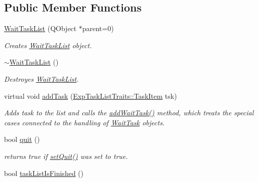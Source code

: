 \subsection*{Public Member Functions}
\begin{DoxyCompactItemize}
\item 
\hyperlink{class_wait_task_list_a2d8cb0fef4e72ba726ed5abf11068a0c}{Wait\+Task\+List} (Q\+Object $\ast$parent=0)
\begin{DoxyCompactList}\small\item\em Creates \hyperlink{class_wait_task_list}{Wait\+Task\+List} object. \end{DoxyCompactList}\item 
\hypertarget{class_wait_task_list_a1ee55fa11961eb48fc27fd43315d6b89}{}\hyperlink{class_wait_task_list_a1ee55fa11961eb48fc27fd43315d6b89}{$\sim$\+Wait\+Task\+List} ()\label{class_wait_task_list_a1ee55fa11961eb48fc27fd43315d6b89}

\begin{DoxyCompactList}\small\item\em Destroyes \hyperlink{class_wait_task_list}{Wait\+Task\+List}. \end{DoxyCompactList}\item 
\hypertarget{class_wait_task_list_a429d0b45f82a2eef00c5dacffbbc1f70}{}virtual void \hyperlink{class_wait_task_list_a429d0b45f82a2eef00c5dacffbbc1f70}{add\+Task} (\hyperlink{struct_exp_task_list_traits_1_1_task_item}{Exp\+Task\+List\+Traits\+::\+Task\+Item} tsk)\label{class_wait_task_list_a429d0b45f82a2eef00c5dacffbbc1f70}

\begin{DoxyCompactList}\small\item\em Adds task to the list and calls the \hyperlink{class_wait_task_list_a2724cb9d9e7f897a4bf0c44054ad2c29}{add\+Wait\+Task()} method, which treats the special cases connected to the handling of \hyperlink{class_wait_task}{Wait\+Task} objects. \end{DoxyCompactList}\item 
\hypertarget{class_wait_task_list_a58f0968b5170d579493176a695c72f8d}{}bool \hyperlink{class_wait_task_list_a58f0968b5170d579493176a695c72f8d}{quit} ()\label{class_wait_task_list_a58f0968b5170d579493176a695c72f8d}

\begin{DoxyCompactList}\small\item\em returns true if \hyperlink{class_wait_task_list_a9757db554cd87cd191cc126a2d5c83cd}{set\+Quit()} was set to true. \end{DoxyCompactList}\item 
\hypertarget{class_wait_task_list_a99ded3b20e08230ebd46dd9fe56d2cfd}{}bool \hyperlink{class_wait_task_list_a99ded3b20e08230ebd46dd9fe56d2cfd}{task\+List\+Is\+Finished} ()\label{class_wait_task_list_a99ded3b20e08230ebd46dd9fe56d2cfd}


\end{DoxyCompactItemize}
